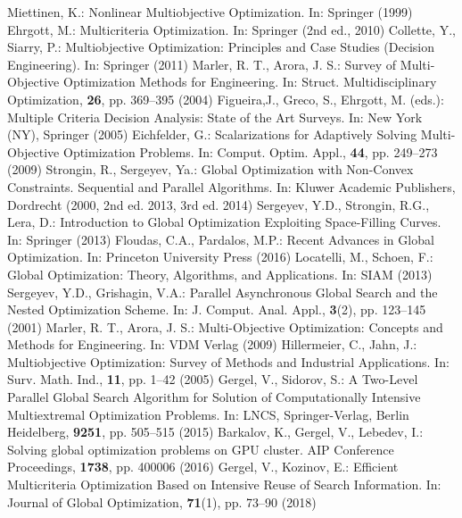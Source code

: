 \documentclass[runningheads]{llncs}
\begin{document}
\begin{thebibliography}{}
%
%
 	Miettinen, K.: Nonlinear Multiobjective Optimization. In: Springer (1999)
 	Ehrgott, M.: Multicriteria Optimization. In: Springer (2nd ed., 2010)
 	Collette, Y., Siarry, P.: Multiobjective Optimization: Principles and Case Studies (Decision Engineering). In: Springer (2011)
 	Marler, R. T., Arora, J. S.: Survey of Multi-Objective Optimization Methods for Engineering. In: Struct. Multidisciplinary Optimization, \textbf{26}, pp. 369--395 (2004)
 	Figueira,J., Greco, S., Ehrgott, M. (eds.): Multiple Criteria Decision Analysis: State of the Art Surveys. In: New York (NY), Springer (2005)
 	Eichfelder, G.: Scalarizations for Adaptively Solving Multi-Objective Optimization Problems. In: Comput. Optim. Appl., \textbf{44}, pp. 249--273 (2009)
 	Strongin, R., Sergeyev, Ya.: Global Optimization with Non-Convex Constraints. Sequential and Parallel Algorithms. In: Kluwer Academic Publishers, Dordrecht (2000, 2nd ed. 2013, 3rd ed. 2014)
 	Sergeyev, Y.D., Strongin, R.G., Lera, D.: Introduction to Global Optimization Exploiting Space-Filling Curves. In: Springer (2013)
 	Floudas, C.A., Pardalos, M.P.: Recent Advances in Global Optimization. In: Princeton University Press (2016)
	Locatelli, M., Schoen, F.: Global Optimization: Theory, Algorithms, and Applications. In: SIAM (2013)
	Sergeyev, Y.D., Grishagin, V.A.: Parallel Asynchronous Global Search and the Nested Optimization Scheme. In: J. Comput. Anal. Appl., \textbf{3}(2), pp. 123--145 (2001)
	Marler, R. T., Arora, J. S.: Multi-Objective Optimization: Concepts and Methods for Engineering. In: VDM Verlag (2009)
	Hillermeier, C., Jahn, J.: Multiobjective Optimization: Survey of Methods and Industrial Applications. In: Surv. Math. Ind., \textbf{11}, pp. 1--42 (2005)
	Gergel, V., Sidorov, S.: A Two-Level Parallel Global Search Algorithm for Solution of Computationally Intensive Multiextremal Optimization Problems. In: LNCS, Springer-Verlag, Berlin Heidelberg, \textbf{9251}, pp. 505--515 (2015)
	Barkalov, K., Gergel, V., Lebedev, I.: Solving global optimization problems on GPU cluster. AIP Conference Proceedings, \textbf{1738}, pp. 400006 (2016) 
	Gergel, V., Kozinov, E.: Efficient Multicriteria Optimization Based on Intensive Reuse of Search Information. In: Journal of Global Optimization, \textbf{71}(1), pp. 73--90 (2018) 

\end{thebibliography}
\end{document}
